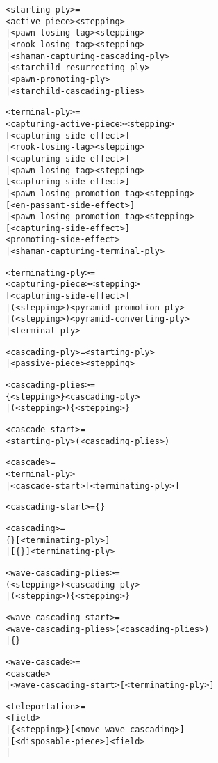 \begin{alltt}
<starting-ply> =
  <active-piece><stepping>
| <pawn-losing-tag><stepping>
| <rook-losing-tag><stepping>
| <shaman-capturing-cascading-ply>
| <starchild-resurrecting-ply>
| <pawn-promoting-ply>
| <starchild-cascading-plies>

<terminal-ply> =
  <capturing-active-piece><stepping>
    [<capturing-side-effect>]
| <rook-losing-tag><stepping>
    [<capturing-side-effect>]
| <pawn-losing-tag><stepping>
    [<capturing-side-effect>]
| <pawn-losing-promotion-tag><stepping>
    [<en-passant-side-effect>]
| <pawn-losing-promotion-tag><stepping>
    [<capturing-side-effect>]
    <promoting-side-effect>
| <shaman-capturing-terminal-ply>

<terminating-ply> =
  <capturing-piece><stepping>
    [<capturing-side-effect>]
| (<stepping>\alg{~})<pyramid-promotion-ply>
| (<stepping>\alg{~})<pyramid-converting-ply>
| <terminal-ply>

<cascading-ply> = <starting-ply>
                | <passive-piece><stepping>
\end{alltt}

\clearpage %

\begin{alltt}
<cascading-plies> =
  \{<stepping>\}\alg{~}<cascading-ply>
| (<stepping>)\{<stepping>\}

<cascade-start> =
  <starting-ply>(<cascading-plies>)

<cascade> =
  <terminal-ply>
| <cascade-start>[\alg{~}<terminating-ply>]

<cascading-start> = \{<cascading-plies>\}

<cascading> =
  \{<cascading-plies>\}[\alg{~}<terminating-ply>]
| [\{<cascading-plies>\}\alg{~}]<terminating-ply>

<wave-cascading-plies> =
  (<stepping>)\alg{~}<cascading-ply>
| (<stepping>)\{<stepping>\}

<wave-cascading-start> =
  <wave-cascading-plies>(<cascading-plies>)
| \{<cascading-plies>\}

<wave-cascade> =
  \alg{~}<cascade>
| <wave-cascading-start>[\alg{~}<terminating-ply>]

<teleportation> =
  \alg{|}<field>
| \{<stepping>\}[<move-wave-cascading>]
| \alg{||}[<disposable-piece>]<field>
| \alg{||}
\end{alltt}

\clearpage %

